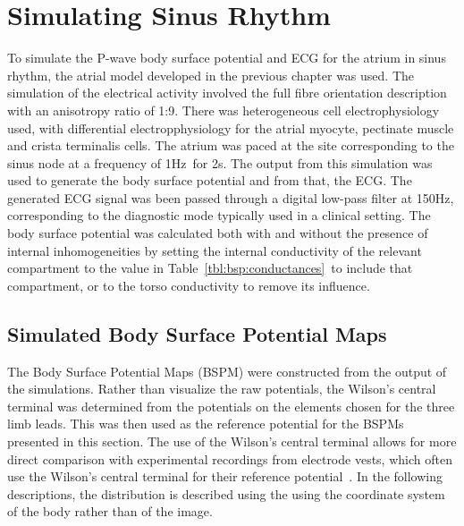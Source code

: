 \section{Simulating Sinus Rhythm}

To simulate the P-wave body surface potential and ECG for the atrium in sinus
rhythm, the atrial model developed in the previous chapter was used.
The simulation of the electrical activity involved the full fibre orientation
description with an anisotropy ratio of 1:9.
There was heterogeneous cell electrophysiology used, with differential
electropphysiology for the atrial myocyte, pectinate muscle and crista
terminalis cells.
The atrium was paced at the site corresponding to the sinus node at a frequency
of \unit{1}{Hz}\ for \unit{2}{s}.
The output from this simulation was used to generate the body surface potential
and from that, the ECG.
The generated ECG signal was been passed through a digital low-pass filter at
\unit{150}{Hz}, corresponding to the diagnostic mode typically used in a
clinical setting.
The body surface potential was calculated both with and without the presence of
internal inhomogeneities by setting the internal conductivity of the relevant
compartment to the value in Table~\ref{tbl:bsp:conductances}\ to include that
compartment, or to the torso conductivity to remove its influence.

\subsection{Simulated Body Surface Potential Maps}

The Body Surface Potential Maps (BSPM) were constructed from the output of the
simulations.
Rather than visualize the raw potentials, the Wilson's central terminal was
determined from the potentials on the elements chosen for the three limb leads.
This was then used as the reference potential for the BSPMs presented in this
section.
The use of the Wilson's central terminal allows for more direct comparison with
experimental recordings from electrode vests, which often use the Wilson's
central terminal for their reference potential~\cite{Taccardi1966,Mirvis1980}.
In the following descriptions, the distribution is described using the using the
coordinate system of the body rather than of the image.

